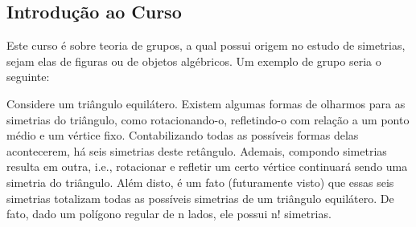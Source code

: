 \documentclass{article}
\begin{document}
\subsection{Introdu\c c\~ao ao Curso}
  Este curso \'e sobre teoria de grupos, a qual possui origem no estudo de simetrias, sejam elas de figuras ou de objetos alg\'ebricos.
Um exemplo de grupo seria o seguinte: 

  Considere um tri\^angulo equil\'atero. Existem algumas formas de olharmos para as simetrias
do tri\^angulo, como rotacionando-o, refletindo-o com rela\c c\~ao a um ponto m\'edio e um v\'ertice fixo. Contabilizando todas as poss\'iveis
formas delas acontecerem, h\'a seis simetrias deste ret\^angulo. Ademais, compondo simetrias resulta em outra, i.e., rotacionar e refletir
um certo v\'ertice continuar\'a sendo uma simetria do tri\^angulo. Al\'em disto, \'e um fato (futuramente visto) que essas seis simetrias 
totalizam todas as poss\'iveis simetrias de um tri\^angulo equil\'atero. De fato, dado um pol\'igono regular de n lados, ele possui
n! simetrias.
\end{document}
